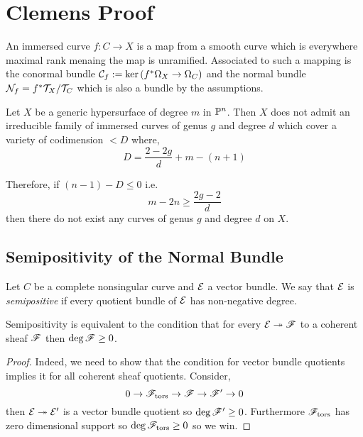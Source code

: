 \documentclass[12pt]{article}
\newcommand{\cN}{\mathcal{N}}
\begin{document}
\section{Clemens Proof}


\begin{defn}
An immersed curve $f : C \to X$ is a map from a smooth curve which is everywhere maximal rank menaing the map is unramified. Associated to such a mapping is the conormal bundle $\C_f := \ker{(f^* \Omega_X \to \Omega_C)}$ and the normal bundle $\cN_f = f^* \T_X / \T_C$ which is also a bundle by the assumptions.
\end{defn}

\begin{theorem}
Let $X$ be a generic hypersurface of degree $m$ in $\P^n$. Then $X$ does not admit an irreducible family of immersed curves of genus $g$ and degree $d$ which cover a variety of codimension $< D$ where,
\[ D = \frac{2 - 2 g}{d} + m - (n+1) \]
\end{theorem}

\begin{cor}
Therefore, if $(n-1) - D \le 0$ i.e.
\[ m - 2 n \ge \frac{2g - 2}{d} \]
then there do not exist any curves of genus $g$ and degree $d$ on $X$.
\end{cor}


\subsection{Semipositivity of the Normal Bundle}

\newcommand{\Gr}{\mathbf{Gr}}

\begin{defn}
Let $C$ be a complete nonsingular curve and $\E$ a vector bundle. We say that $\E$ is \textit{semipositive} if every quotient bundle of $\E$ has non-negative degree.
\end{defn}

\begin{lemma}
Semipositivity is equivalent to the condition that for every $\E \onto \F$ to a coherent sheaf $\F$ then $\deg{\F} \ge 0$.
\end{lemma}

\begin{proof}
Indeed, we need to show that the condition for vector bundle quotients implies it for all coherent sheaf quotients. Consider,
\[ 0 \to \F_{\tors} \to \F \to \F' \to 0 \]
then $\E \onto \E'$ is a vector bundle quotient so $\deg{\F'} \ge 0$. Furthermore $\F_{\tors}$ has zero dimensional support so $\deg{\F_{\tors}} \ge 0$ so we win.
\end{proof}
\end{document}
